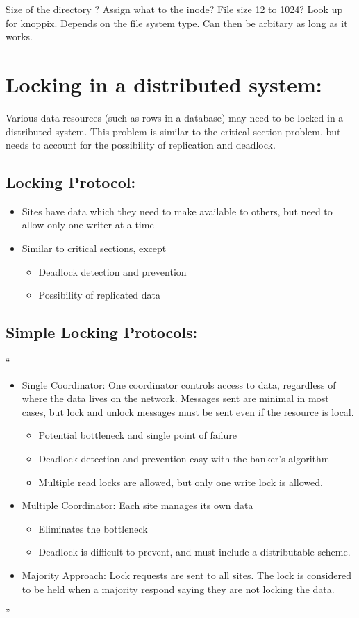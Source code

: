 \documentclass[11pt]{article}
\begin{document}
	Size of the directory ?  Assign what to the inode?  File size 12 to 1024?  Look up for knoppix.  Depends on the file system type.  Can then be arbitary as long as it works.  

	
\section{Locking in a distributed system:}
Various data resources (such as rows in a database) may need to be locked in a distributed system.  This problem is similar to the critical section problem, but needs to account for the possibility of replication and deadlock.
\subsection{Locking Protocol:}
\begin{itemize}
\item Sites have data which they need to make available to others, but need to allow only one writer at a time
\item Similar to critical sections, except 
\begin{itemize}
\item Deadlock detection and prevention 
\item Possibility of replicated data
\end{itemize}
\end{itemize}


\subsection{Simple Locking Protocols:}
``\begin{itemize}
\item Single Coordinator: One coordinator controls access to data, regardless of where the data lives on the network.  Messages sent are minimal in most cases, but lock and unlock messages must be sent even if the resource is local.
\begin{itemize}
\item Potential bottleneck and single point of failure
\item Deadlock detection and prevention easy with the banker's algorithm
\item Multiple read locks are allowed, but only one write lock is allowed.
\end{itemize}
\item Multiple Coordinator: Each site manages its own data
\begin{itemize}
\item Eliminates the bottleneck 
\item Deadlock is difficult to prevent, and must include a distributable scheme.
\end{itemize}
\item Majority Approach: Lock requests are sent to all sites.  The lock is considered to be held when a majority respond saying they are not locking the data.  
\end{itemize}''
\end{document}
